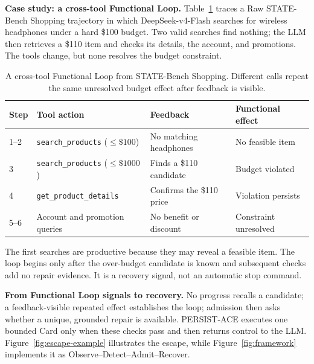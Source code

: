 \textbf{Case study: a cross-tool Functional Loop.}
Table~\ref{tab:cross-tool-fl-case} traces a Raw STATE-Bench Shopping
trajectory in which DeepSeek-v4-Flash searches for wireless headphones under
a hard \$100 budget. Two valid searches find nothing; the LLM then retrieves a
\$110 item and checks its details, the account, and promotions. The tools
change, but none resolves the budget constraint.

\begin{table}[t]
\centering
\scriptsize
\setlength{\tabcolsep}{2pt}
\begin{tabular}{@{}p{}p{}p{}p{}@{}}
\toprule
Step & Tool action & Feedback & Functional effect \\
\midrule
1--2 & \texttt{search\_products} ($\leq\$100$) & No matching headphones & No feasible item \\
3 & \texttt{search\_products} ($\leq\$1000$) & Finds a \$110 candidate & Budget violated \\
4 & \texttt{get\_product}\newline\texttt{\_details} & Confirms the \$110 price & Violation persists \\
5--6 & Account and promotion queries & No benefit or discount & Constraint unresolved \\
\bottomrule
\end{tabular}
\caption{A cross-tool Functional Loop from STATE-Bench Shopping. Different
calls repeat the same unresolved budget effect after feedback is visible.}
\label{tab:cross-tool-fl-case}
\end{table}

The first searches are productive because they may reveal a feasible item. The
loop begins only after the over-budget candidate is known and subsequent checks
add no repair evidence. It is a recovery signal, not an automatic stop command.

\textbf{From Functional Loop signals to recovery.}
No progress recalls a candidate; a feedback-visible repeated effect establishes
the loop; admission then asks whether a unique, grounded repair is available.
PERSIST-ACE executes one bounded Card only when these checks pass and then
returns control to the LLM. Figure~\ref{fig:escape-example} illustrates the
escape, while Figure~\ref{fig:framework} implements it as
Observe--Detect--Admit--Recover.
